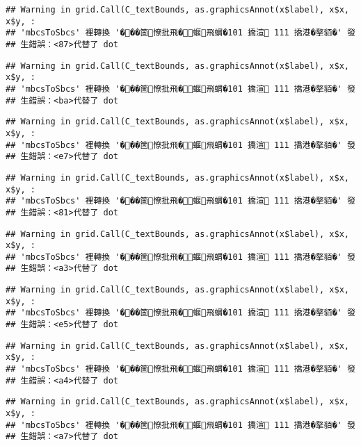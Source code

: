 \documentclass[
]{article}
\begin{document}
\begin{verbatim}
## Warning in grid.Call(C_textBounds, as.graphicsAnnot(x$label), x$x, x$y, :
## 'mbcsToSbcs' 裡轉換 '���箇憭批飛�蝘飛蝟�101 撟渲 111 撟港�摮貊�' 發
## 生錯誤：<87>代替了 dot
\end{verbatim}

\begin{verbatim}
## Warning in grid.Call(C_textBounds, as.graphicsAnnot(x$label), x$x, x$y, :
## 'mbcsToSbcs' 裡轉換 '���箇憭批飛�蝘飛蝟�101 撟渲 111 撟港�摮貊�' 發
## 生錯誤：<ba>代替了 dot
\end{verbatim}

\begin{verbatim}
## Warning in grid.Call(C_textBounds, as.graphicsAnnot(x$label), x$x, x$y, :
## 'mbcsToSbcs' 裡轉換 '���箇憭批飛�蝘飛蝟�101 撟渲 111 撟港�摮貊�' 發
## 生錯誤：<e7>代替了 dot
\end{verbatim}

\begin{verbatim}
## Warning in grid.Call(C_textBounds, as.graphicsAnnot(x$label), x$x, x$y, :
## 'mbcsToSbcs' 裡轉換 '���箇憭批飛�蝘飛蝟�101 撟渲 111 撟港�摮貊�' 發
## 生錯誤：<81>代替了 dot
\end{verbatim}

\begin{verbatim}
## Warning in grid.Call(C_textBounds, as.graphicsAnnot(x$label), x$x, x$y, :
## 'mbcsToSbcs' 裡轉換 '���箇憭批飛�蝘飛蝟�101 撟渲 111 撟港�摮貊�' 發
## 生錯誤：<a3>代替了 dot
\end{verbatim}

\begin{verbatim}
## Warning in grid.Call(C_textBounds, as.graphicsAnnot(x$label), x$x, x$y, :
## 'mbcsToSbcs' 裡轉換 '���箇憭批飛�蝘飛蝟�101 撟渲 111 撟港�摮貊�' 發
## 生錯誤：<e5>代替了 dot
\end{verbatim}

\begin{verbatim}
## Warning in grid.Call(C_textBounds, as.graphicsAnnot(x$label), x$x, x$y, :
## 'mbcsToSbcs' 裡轉換 '���箇憭批飛�蝘飛蝟�101 撟渲 111 撟港�摮貊�' 發
## 生錯誤：<a4>代替了 dot
\end{verbatim}

\begin{verbatim}
## Warning in grid.Call(C_textBounds, as.graphicsAnnot(x$label), x$x, x$y, :
## 'mbcsToSbcs' 裡轉換 '���箇憭批飛�蝘飛蝟�101 撟渲 111 撟港�摮貊�' 發
## 生錯誤：<a7>代替了 dot
\end{verbatim}
\end{document}
